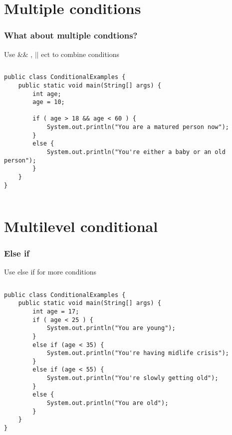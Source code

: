 \documentclass{beamer}
\begin{document}
\section{Multiple conditions}

\begin{frame}[fragile]
\frametitle{What about multiple condtions?}
\centerline{\huge{Use \&\& , $||$  ect  to combine conditions }}
\vspace{0.2in}
\begin{columns}[T]
\begin{column}{\textwidth}
\begin{lstlisting}
public class ConditionalExamples {
    public static void main(String[] args) {
        int age;
        age = 10;

        if ( age > 18 && age < 60 ) {
            System.out.println("You are a matured person now");
        }
        else {
            System.out.println("You're either a baby or an old person");
        }
    }
}
\end{lstlisting}
\end{column}
\end{columns}
\end{frame}


\section{Multilevel conditional}

\begin{frame}[fragile]
\frametitle{Else if}
\centerline{\huge{Use else if for more conditions }}
\begin{columns}[T]
\begin{column}{\textwidth}
\begin{lstlisting}
public class ConditionalExamples {
    public static void main(String[] args) {
        int age = 17;
        if ( age < 25 ) {
            System.out.println("You are young");
        }
        else if (age < 35) {
            System.out.println("You're having midlife crisis");
        }
        else if (age < 55) {
            System.out.println("You're slowly getting old");
        }
        else {
            System.out.println("You are old");
        }
    }
}
\end{lstlisting}
\end{column}
\end{columns}
\end{frame}
\end{document}
